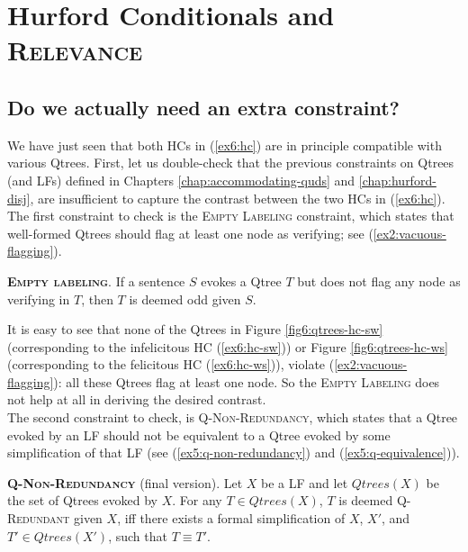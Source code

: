 \section{Hurford Conditionals and \textsc{Relevance}}\label{sec6:relevance}
\subsection{Do we actually need an extra constraint?}
We have just seen that both HCs in (\ref{ex6:hc}) are in principle compatible with various Qtrees. First, let us double-check that the previous constraints on Qtrees (and LFs) defined in Chapters \ref{chap:accommodating-quds} and \ref{chap:hurford-disj}, are insufficient to capture the contrast between the two HCs in (\ref{ex6:hc}). The first constraint to check is the \textsc{Empty Labeling} constraint, which states that well-formed Qtrees should flag at least one node as verifying; see (\ref{ex2:vacuous-flagging}).

\begin{exe}
	 {\textsc{\textbf{Empty labeling}}. If a sentence $S$ evokes a Qtree $T$ but does not flag any node as verifying in $T$, then $T$ is deemed odd given $S$.}
\end{exe}

It is easy to see that none of the Qtrees in Figure \ref{fig6:qtrees-hc-sw} (corresponding to the infelicitous HC (\ref{ex6:hc-sw})) or Figure \ref{fig6:qtrees-hc-ws} (corresponding to the felicitous HC (\ref{ex6:hc-ws})), violate (\ref{ex2:vacuous-flagging}): all these Qtrees flag at least one node. So the \textsc{Empty Labeling} does not help at all in deriving the desired contrast.\\


The second constraint to check, is \textsc{Q-Non-Redundancy}, which states that a Qtree evoked by an LF should not be equivalent to a Qtree evoked by some simplification of that LF (see (\ref{ex5:q-non-redundancy}) and (\ref{ex5:q-equivalence})).
\begin{exe}
	 {\textsc{\textbf{Q-Non-Redundancy}} (final version). Let $X$ be a LF and let $Qtrees(X)$ be the set of Qtrees evoked by $X$. For any $T \in Qtrees(X)$, $T$ is deemed \textsc{Q-Redundant} given $X$, iff there exists a formal simplification of $X$, $X'$, and $T' \in Qtrees(X')$, such that $T\equiv T'$.}
\end{exe}


